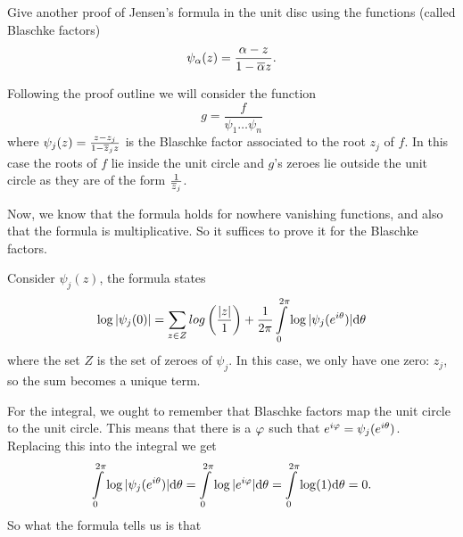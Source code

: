 \documentclass[12pt]{memoir}
\begin{document}
\begin{Ej}
    Give another proof of Jensen's formula in the unit disc using the functions
(called Blaschke factors)
$$\psi_\alpha(z)=\frac{\alpha-z}{1-\overline{\alpha} z}.$$
\end{Ej}

\begin{ptcbr}
    Following the proof outline we will consider the function 
    $$g=\frac{f}{\psi_1\dots\psi_n}$$
    where $\psi_j(z)=\frac{z-z_j}{1-\overline z_j z}$ is the Blaschke factor associated to the root $z_j$ of $f$. In this case the roots of $f$ lie inside the unit circle and $g$'s zeroes lie outside the unit circle as they are of the form $\frac{1}{\overline z_j}$.\par
    Now, we know that the formula holds for nowhere vanishing functions, and also that the formula is multiplicative. So it suffices to prove it for the Blaschke factors.\par 
    Consider $\psi_j(z)$, the formula states 
    $$\log|\psi_j(0)|=\sum_{z\in Z}log\left(\frac{|z|}{1}\right)+\frac{1}{2\pi}\int\limits_0^{2\pi}\log|\psi_j(e^{i\theta})|\dd\theta$$
    where the set $Z$ is the set of zeroes of $\psi_j$. In this case, we only have one zero: $z_j$, so the sum becomes a unique term.\par 
    For the integral, we ought to remember that Blaschke factors map the unit circle to the unit circle. This means that there is a $\varphi$ such that $e^{i\varphi}=\psi_j(e^{i\theta})$. Replacing this into the integral we get 
    $$\int\limits_0^{2\pi}\log|\psi_j(e^{i\theta})|\dd\theta=\int\limits_0^{2\pi}\log|e^{i\varphi}|\dd\theta=\int\limits_0^{2\pi}\log(1)\dd\theta=0.$$
    So what the formula tells us is that 
\end{ptcbr}
\end{document}
